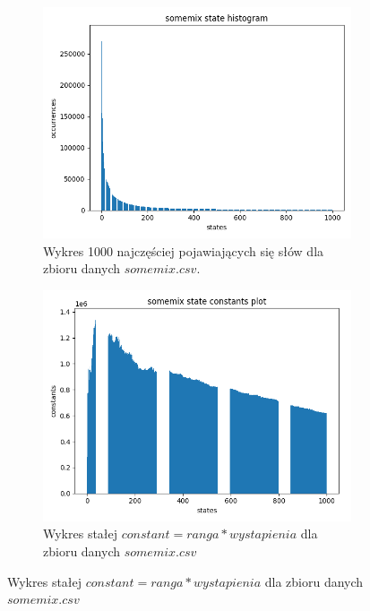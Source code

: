 \documentclass{article}
\begin{document}
\begin{figure}
     \centering
     \begin{subfigure}[b]{0.75\textwidth}
         \centering
         \includegraphics[width=\textwidth]{somemix_zipf1}
         \caption{Wykres 1000 najczęściej pojawiających się słów dla zbioru danych $somemix.csv$.}
         \label{fig:mesh1}
     \end{subfigure}
     \hfill
     \begin{subfigure}[b]{0.75\textwidth}
         \centering
         \includegraphics[width=\textwidth]{somemix_zipf2}
         \caption{Wykres stałej $constant = ranga * wystapienia$ dla zbioru danych $somemix.csv$}
         \label{fig:mesh1}
     \end{subfigure}
\end{figure}
\end{document}
